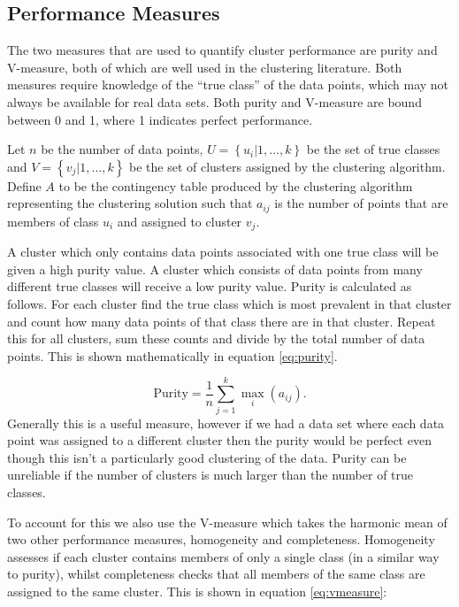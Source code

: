 \subsection{Performance Measures}
\label{sec:performance}
The two measures that are used to quantify cluster performance are purity and V-measure, both of which are well used in the clustering literature. Both measures require knowledge of the ``true class'' of the data points, which may not always be available for real data sets. Both purity and V-measure are bound between 0 and 1, where 1 indicates perfect performance. 

Let $n$ be the number of data points, $U = \left\{ u_i | 1, \ldots, k  \right\} $ be the set of true classes and $V = \left\{ v_j | 1, \ldots, k \right\}$ be the set of clusters assigned by the clustering algorithm.  Define $A$  to be  the contingency table produced by the clustering algorithm representing the clustering solution such that $a_{ij}$ is the number of points that are members of class $u_i$ and assigned to cluster $v_j$.

 A cluster which only contains data points associated with one true class will be given a high purity value. A cluster which consists of data points from many different true classes will receive a low purity value.  Purity is calculated as follows. For each cluster find the true class which is most prevalent in that cluster and count how many data points of that class there are in that cluster. Repeat this for all clusters, sum these counts and divide by the total number of data points. This is shown mathematically in equation \eqref{eq:purity}.

\begin{equation}
  \label{eq:purity}
  \text{Purity} = \frac{1}{n} \sum_{j = 1}^{k} \max_{i} (a_{ij}).
\end{equation}
Generally this is a useful measure, however if we had a data set where each data point was assigned to a different cluster then the purity would be perfect even though this isn't a particularly good clustering of the data. Purity can be unreliable if the number of clusters is much larger than the number of true classes. 

To account for this we also use the V-measure \citep{Rosenberg2007} which  takes the harmonic mean of two other performance measures, homogeneity and completeness. Homogeneity assesses if each cluster contains members of only a single class (in a similar way to purity), whilst completeness checks that all members of the same class are assigned to the same cluster. This is shown in equation \eqref{eq:vmeasure}:

